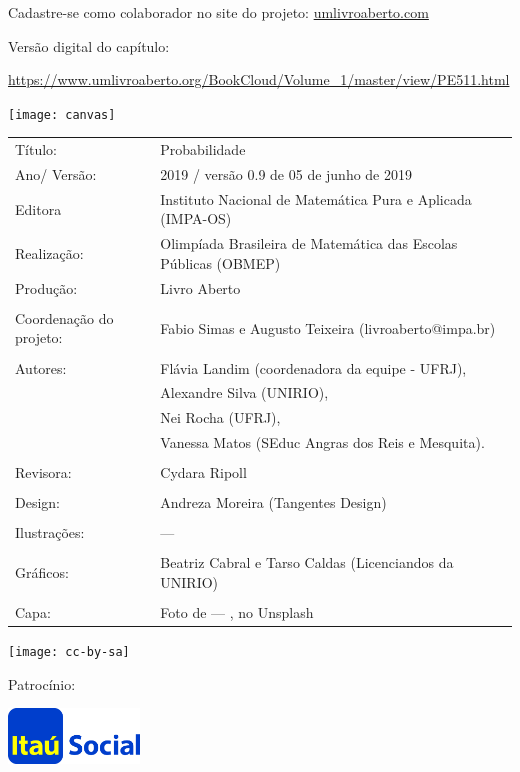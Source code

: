 \vspace*{.3cm}

Cadastre-se como colaborador no site do projeto: \url{umlivroaberto.com}

Versão digital do capítulo:

\url{https://www.umlivroaberto.org/BookCloud/Volume_1/master/view/PE511.html}

\begin{center}
  \texttt{[image: canvas]}
\end{center}

\begin{tabular}{p{}p{}}
Título: & Probabilidade\\
Ano/ Versão: & 2019 / versão 0.9 de 05 de junho de 2019\\
Editora & Instituto Nacional de Matem\'atica Pura e Aplicada (IMPA-OS)\\
Realização:& Olimp\'iada Brasileira de Matem\'atica das Escolas P\'ublicas (OBMEP)\\
Produção:& Livro Aberto\\
\\
Coordenação do projeto: & Fabio Simas e Augusto Teixeira (livroaberto@impa.br)\\
\\
  Autores: & Flávia Landim (coordenadora da equipe - UFRJ),\\
        & Alexandre Silva (UNIRIO),\\
        & Nei Rocha (UFRJ),\\
             & Vanessa Matos (SEduc Angras dos Reis e Mesquita).\\
\\
Revisora: &  Cydara Ripoll  \\
\\
Design: & Andreza Moreira (Tangentes Design) \\
\\
  Ilustrações: & --- \\ 
\\
Gráficos: & Beatriz Cabral e Tarso Caldas (Licenciandos da UNIRIO)\\
\\
  Capa: & Foto de --- , no Unsplash \\

\end{tabular}
\vspace{.5cm}


\begin{minipage}[l]{5cm}
  \texttt{[image: cc-by-sa]}
\end{minipage}\hfill
\begin{minipage}[r]{5cm}
{\Large  Patrocínio:}
  
  \includegraphics[width=3.5cm]{itau}
\end{minipage}

